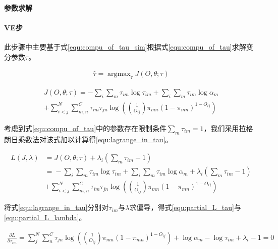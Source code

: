 \paragraph{参数求解}

\paragraph*{VE步}此步骤中主要基于式\ref{equ:compu_of_tau_sim}根据式\ref{equ:compu_of_tau}求解变分参数$\tau$。

\begin{equation}\label{equ:compu_of_tau_sim}
  \begin{aligned}
\hat{\tau}=\mathop{\arg\max}_\tau J(O,\theta;\tau)
\end{aligned}\end{equation}

\begin{equation}\label{equ:compu_of_tau}
  \begin{aligned}
J(O,\theta;\tau)=-\sum_i\sum_m\tau_{im} \log \tau_{im} +\sum_i\sum_m \tau_{im} \log \alpha_m\\ +\sum_{i<j}^N\sum_{m,n}^C\tau_{im}\tau_{jn}\log ( \binom{1}{O_{ij}}\pi_{mn}(1-\pi_{mn})^{1-O_{ij}})
\end{aligned}\end{equation}

考虑到式\ref{equ:compu_of_tau}中的参数存在限制条件$\sum_m \tau_{im} =1$，我们采用拉格朗日乘数法\cite{haj_stochastics_2019}对该式加以计算得\ref{equ:lagrange_in_tau}。

\begin{equation}\label{equ:lagrange_in_tau}
  \begin{aligned}
L(J,\lambda)&={}J(O,\theta;\tau)+\lambda_i(\sum_m \tau_{im}-1)\\
&={}-\sum_i\sum_m\tau_{im} \log \tau_{im} +\sum_i\sum_m \tau_{im} \log \alpha_m+\lambda_i(\sum_m \tau_{im}-1)\\ &+\sum_{i<j}^N\sum_{m,n}^C\tau_{im}\tau_{jn}\log ( \binom{1}{O_{ij}}\pi_{mn}(1-\pi_{mn})^{1-O_{ij}})
\end{aligned}\end{equation}

将式\ref{equ:lagrange_in_tau}分别对$\tau_{im}$与$\lambda$求偏导，得式\ref{equ:partial_L_tau}与\ref{equ:partial_L_lambda}。

\begin{equation}\label{equ:partial_L_tau}
  \begin{aligned}
\frac{\partial L}{\partial \tau_{im}}=\sum_{j}^N\sum_{n}^C\tau_{jn}\log ( \binom{1}{O_{ij}}\pi_{mn}(1-\pi_{mn})^{1-O_{ij}})+\log \alpha_m -\log \tau_{im} +\lambda_i-1=0
\end{aligned}\end{equation}

